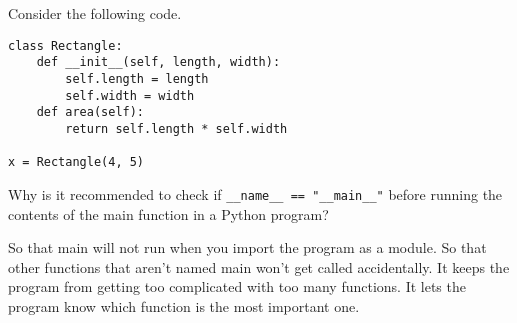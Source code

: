 \documentclass[12pt]{exam}
\begin{document}
\begin{questions}

\question Consider the following code. 


\begin{verbatim}
class Rectangle:
    def __init__(self, length, width):
        self.length = length
        self.width = width
    def area(self):
        return self.length * self.width

x = Rectangle(4, 5)
\end{verbatim}

\question Why is it recommended to check if \verb|__name__ == "__main__"| before running the contents of the main function in a Python program?  
\begin{choices}
\CorrectChoice So that main will not run when you import the program as a module. 
\choice So that other functions that aren't named main won't get called accidentally. 
\choice It keeps the program from getting too complicated with too many functions. 
\choice It lets the program know which function is the most important one. 
\end{choices}

\end{questions}
\end{document}
